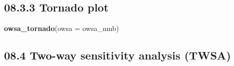 \documentclass[
]{article}
\newenvironment{Shaded}{\begin{snugshade}}{\end{snugshade}}
\newcommand{\DataTypeTok}[1]{\textcolor[rgb]{0.13,0.29,0.53}{#1}}
\newcommand{\KeywordTok}[1]{\textcolor[rgb]{0.13,0.29,0.53}{\textbf{#1}}}
\newcommand{\NormalTok}[1]{#1}
\begin{document}
\hypertarget{tornado-plot}{%
\subsection{08.3.3 Tornado plot}\label{tornado-plot}}

\begin{Shaded}
\begin{Highlighting}[]
\KeywordTok{owsa_tornado}\NormalTok{(}\DataTypeTok{owsa =}\NormalTok{ owsa_nmb)}
\end{Highlighting}
\end{Shaded}

\hypertarget{two-way-sensitivity-analysis-twsa}{%
\subsection{08.4 Two-way sensitivity analysis
(TWSA)}\label{two-way-sensitivity-analysis-twsa}}
\end{document}

